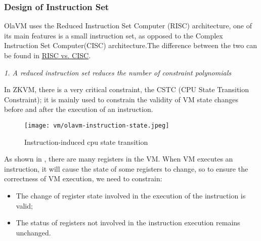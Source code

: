 \subsubsection{Design of Instruction Set} \label{sec:design-instruction-set}

OlaVM uses the Reduced Instruction Set Computer (RISC) architecture, one of its main features is a small instruction set, as opposed
to the Complex Instruction Set Computer(CISC) architecture.The difference between the two can be found in
\href{https://cs.stanford.edu/people/eroberts/courses/soco/projects/risc/risccisc/}{RISC vs. CISC}.

\emph{1. A reduced instruction set reduces the number of constraint polynomials}

In ZKVM, there is a very critical constraint, the CSTC (CPU State Transition Constraint); it is mainly used to constrain the validity
of VM state changes before and after the execution of an instruction.

\begin{figure}[!ht]
    \centering
    \texttt{[image: vm/olavm-instruction-state.jpeg]}
    \caption{Instruction-induced cpu state transition}
    \label{fig:instruction-cpu-state-transition}
\end{figure}

As shown in , there are many registers in the VM. When VM executes an instruction, it will
cause the state of some registers to change, so to ensure the correctness of VM execution, we need to constrain:
\begin{itemize}
    \item The change of register state involved in the execution of the instruction is valid;
    \item The status of registers not involved in the instruction execution remains unchanged.
\end{itemize}

